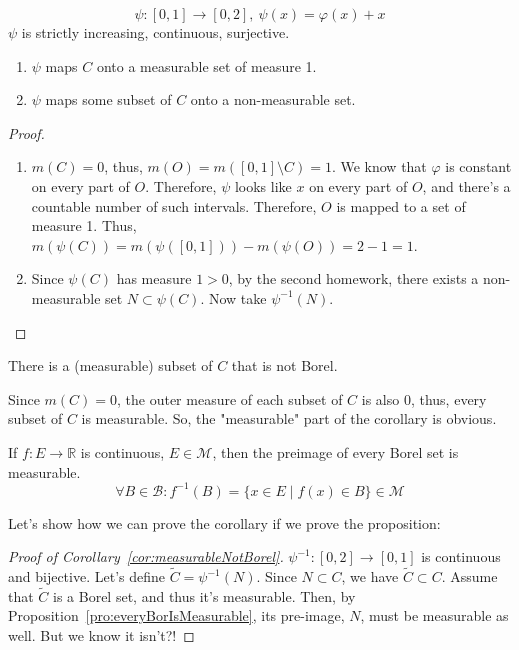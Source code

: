 \begin{definition}
    \[ \psi: [0,1] \to [0,2],\ \psi(x) = \varphi(x) + x \]
    $\psi$ is strictly increasing, continuous, surjective.
\end{definition}
\begin{proposition}
    \begin{enumerate}
        \item {
            $\psi$ maps $C$ onto a measurable set of measure 1.
        }
        \item {
            $\psi$ maps some subset of $C$ onto a non-measurable set.
        }
    \end{enumerate}
\end{proposition}
\begin{proof}
    \begin{enumerate}
        \item {
            $m(C) = 0$, thus, $m(O) = m([0, 1] \setminus C) = 1$. We know that
            $\varphi$ is constant on every part of $O$.
            Therefore, $\psi$ looks like $x$ on every part of $O$,
            and there's a countable number of such intervals.
            Therefore, $O$ is mapped to a set of measure 1.
            Thus, $m(\psi(C)) = m(\psi([0, 1])) - m(\psi(O)) = 2 - 1 = 1$.
        }
        \item {
            Since $\psi(C)$ has measure $1 > 0$, by the second homework,
            there exists a non-measurable set $N \subset \psi(C)$. Now
            take $\psi^{-1}(N)$.
        }
    \end{enumerate}
\end{proof}
\begin{corollary}
    \label{cor:measurableNotBorel}
    There is a (measurable) subset of $C$ that is not Borel.
\end{corollary}
\begin{remark}
    Since $m(C) = 0$, the outer measure of each subset of $C$ is also 0,
    thus, every subset of $C$ is measurable. So, the "measurable" part of the 
    corollary is obvious.
\end{remark}
\begin{proposition}
    \label{pro:everyBorIsMeasurable}
    If $f : E \to \mathbb{R}$ is continuous, $E \in \mathcal{M}$, then
    the preimage of every Borel set is measurable.
    \[ \forall B \in \mathcal{B}: f^{-1}(B) = \{ x \in E \mid f(x) \in B \} \in \mathcal{M} \]
\end{proposition}
Let's show how we can prove the corollary if we prove the proposition:
\begin{proof}[Proof of Corollary~\ref{cor:measurableNotBorel}]
    $\psi^{-1}: [0, 2] \to [0, 1]$ is continuous and bijective.
    Let's define $\tilde{C} = \psi^{-1}(N)$. Since $N \subset C$, we have
    $\tilde{C} \subset C$.
    Assume that $\tilde{C}$ is a Borel set, and thus it's measurable.
    Then, by Proposition~\ref{pro:everyBorIsMeasurable},
    its pre-image, $N$, must be measurable as well. But we know it isn't?!
\end{proof}

